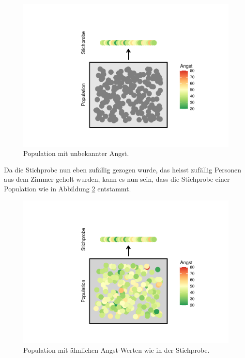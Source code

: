 \documentclass[
]{book}
\theoremstyle{definition}
\theoremstyle{definition}
\theoremstyle{definition}
\theoremstyle{definition}
\theoremstyle{remark}
\begin{document}
\begin{figure}
\centering
\includegraphics{aps_statistik1_files/figure-latex/srs-intervall-nocol-1.pdf}
\caption{\label{fig:srs-intervall-nocol}Population mit unbekannter Angst.}
\end{figure}

Da die Stichprobe nun eben zufällig gezogen wurde, das heisst zufällig Personen aus dem Zimmer geholt wurden, kann es nun sein, dass die Stichprobe einer Population wie in Abbildung \ref{fig:srs-intervall-high-p} entstammt.

\begin{figure}
\centering
\includegraphics{aps_statistik1_files/figure-latex/srs-intervall-high-p-1.pdf}
\caption{\label{fig:srs-intervall-high-p}Population mit ähnlichen Angst-Werten wie in der Stichprobe.}
\end{figure}
\end{document}
